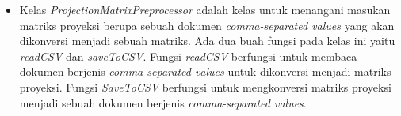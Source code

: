 \begin{itemize}
    \item Kelas \textit{ProjectionMatrixPreprocessor} adalah kelas untuk menangani masukan matriks proyeksi berupa sebuah dokumen \textit{comma-separated values} yang akan dikonversi menjadi sebuah matriks. Ada dua buah fungsi pada kelas ini yaitu \textit{readCSV} dan \textit{saveToCSV}. Fungsi \textit{readCSV} berfungsi untuk membaca dokumen berjenis \textit{comma-separated values} untuk dikonversi menjadi matriks proyeksi. Fungsi \textit{SaveToCSV} berfungsi untuk mengkonversi matriks proyeksi menjadi sebuah dokumen berjenis \textit{comma-separated values}.
\end{itemize}
